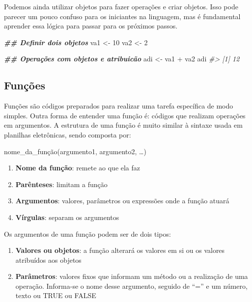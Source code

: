 \documentclass[
]{book}
\newenvironment{Shaded}{\begin{snugshade}}{\end{snugshade}}
\newcommand{\CommentTok}[1]{\textcolor[rgb]{0.37,0.37,0.37}{\textit{#1}}}
\newcommand{\DecValTok}[1]{\textcolor[rgb]{0.06,0.06,0.06}{#1}}
\newcommand{\DocumentationTok}[1]{\textcolor[rgb]{0.37,0.37,0.37}{\textbf{\textit{#1}}}}
\newcommand{\NormalTok}[1]{#1}
\newcommand{\OtherTok}[1]{\textcolor[rgb]{0.37,0.37,0.37}{#1}}
\newcommand{\SpecialCharTok}[1]{\textcolor[rgb]{0,0,0}{#1}}
\providecommand{\tightlist}{%
  \setlength{\itemsep}{0pt}\setlength{\parskip}{0pt}}
\renewenvironment{quote}{\begin{VF}}{\end{VF}}
\begin{document}
Podemos ainda utilizar objetos para fazer operações e criar objetos. Isso pode parecer um pouco confuso para os iniciantes na linguagem, mas é fundamental aprender essa lógica para passar para os próximos passos.

\begin{Shaded}
\begin{Highlighting}[]
\DocumentationTok{\#\# Definir dois objetos}
\NormalTok{va1 }\OtherTok{\textless{}{-}} \DecValTok{10}
\NormalTok{va2 }\OtherTok{\textless{}{-}} \DecValTok{2}

\DocumentationTok{\#\# Operações com objetos e atribuicão}
\NormalTok{adi }\OtherTok{\textless{}{-}}\NormalTok{ va1 }\SpecialCharTok{+}\NormalTok{ va2}
\NormalTok{adi}
\CommentTok{\#\textgreater{} [1] 12}
\end{Highlighting}
\end{Shaded}

\hypertarget{funuxe7uxf5es}{%
\subsection{Funções}\label{funuxe7uxf5es}}

Funções são códigos preparados para realizar uma tarefa específica de modo simples. Outra forma de entender uma função é: códigos que realizam operações em argumentos. A estrutura de uma função é muito similar à sintaxe usada em planilhas eletrônicas, sendo composta por:

\begin{quote}
nome\_da\_função(argumento1, argumento2, \ldots)
\end{quote}

\begin{enumerate}
\def\labelenumi{\arabic{enumi}.}
\tightlist
\item
  \textbf{Nome da função}: remete ao que ela faz
\item
  \textbf{Parênteses}: limitam a função
\item
  \textbf{Argumentos}: valores, parâmetros ou expressões onde a função atuará
\item
  \textbf{Vírgulas}: separam os argumentos
\end{enumerate}

Os argumentos de uma função podem ser de dois tipos:

\begin{enumerate}
\def\labelenumi{\arabic{enumi}.}
\tightlist
\item
  \textbf{Valores ou objetos}: a função alterará os valores em si ou os valores atribuídos aos objetos
\item
  \textbf{Parâmetros}: valores fixos que informam um método ou a realização de uma operação. Informa-se o nome desse argumento, seguido de ``='' e um número, texto ou TRUE ou FALSE
\end{enumerate}
\end{document}
